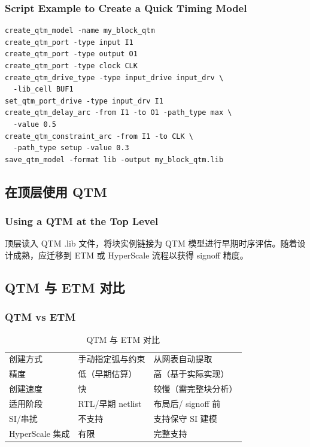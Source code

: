 \subsubsection*{Script Example to Create a Quick Timing Model}

\begin{lstlisting}
create_qtm_model -name my_block_qtm
create_qtm_port -type input I1
create_qtm_port -type output O1
create_qtm_port -type clock CLK
create_qtm_drive_type -type input_drive input_drv \
  -lib_cell BUF1
set_qtm_port_drive -type input_drv I1
create_qtm_delay_arc -from I1 -to O1 -path_type max \
  -value 0.5
create_qtm_constraint_arc -from I1 -to CLK \
  -path_type setup -value 0.3
save_qtm_model -format lib -output my_block_qtm.lib
\end{lstlisting}

\subsection{在顶层使用 QTM}
\subsubsection*{Using a QTM at the Top Level}

顶层读入 QTM .lib 文件，将块实例链接为 QTM 模型进行早期时序评估。随着设计成熟，应迁移到 ETM 或 HyperScale 流程以获得 signoff 精度。

\subsection{QTM 与 ETM 对比}
\subsubsection*{QTM vs ETM}

\begin{table}[htbp]
\centering
\caption{QTM 与 ETM 对比}
\begin{tabularx}{\textwidth}{|X|X|X|}
\hline
\tblhead{特性} & \tblhead{QTM} & \tblhead{ETM} \\
\hline
创建方式 & 手动指定弧与约束 & 从网表自动提取 \\
精度 & 低（早期估算） & 高（基于实际实现） \\
创建速度 & 快 & 较慢（需完整块分析） \\
适用阶段 & RTL/早期 netlist & 布局后/ signoff 前 \\
SI/串扰 & 不支持 & 支持保守 SI 建模 \\
HyperScale 集成 & 有限 & 完整支持 \\
\hline
\end{tabularx}
\end{table}

